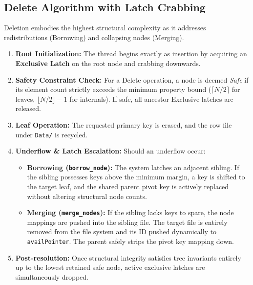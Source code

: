 \documentclass[12pt, a4paper]{article}
\begin{document}
\subsection{Delete Algorithm with Latch Crabbing}
Deletion embodies the highest structural complexity as it addresses redistributions (Borrowing) and collapsing nodes (Merging).
\begin{enumerate}
    \item \textbf{Root Initialization:} The thread begins exactly as insertion by acquiring an \textbf{Exclusive Latch} on the root node and crabbing downwards.
    \item \textbf{Safety Constraint Check:} For a Delete operation, a node is deemed \textit{Safe} if its element count strictly exceeds the minimum property bound ($\lceil N/2 \rceil$ for leaves, $\lfloor N/2 \rfloor - 1$ for internals). If safe, all ancestor Exclusive latches are released.
    \item \textbf{Leaf Operation:} The requested primary key is erased, and the row file under \texttt{Data/} is recycled. 
    \item \textbf{Underflow \& Latch Escalation:} Should an underflow occur:
    \begin{itemize}
        \item \textbf{Borrowing (\texttt{borrow\_node}):} The system latches an adjacent sibling. If the sibling possesses keys above the minimum margin, a key is shifted to the target leaf, and the shared parent pivot key is actively replaced without altering structural node counts.
        \item \textbf{Merging (\texttt{merge\_nodes}):} If the sibling lacks keys to spare, the node mappings are pushed into the sibling file. The target file is entirely removed from the file system and its ID pushed dynamically to \texttt{availPointer}. The parent safely strips the pivot key mapping down.
    \end{itemize}
    \item \textbf{Post-resolution:} Once structural integrity satisfies tree invariants entirely up to the lowest retained safe node, active exclusive latches are simultaneously dropped. 
\end{enumerate}
\end{document}
